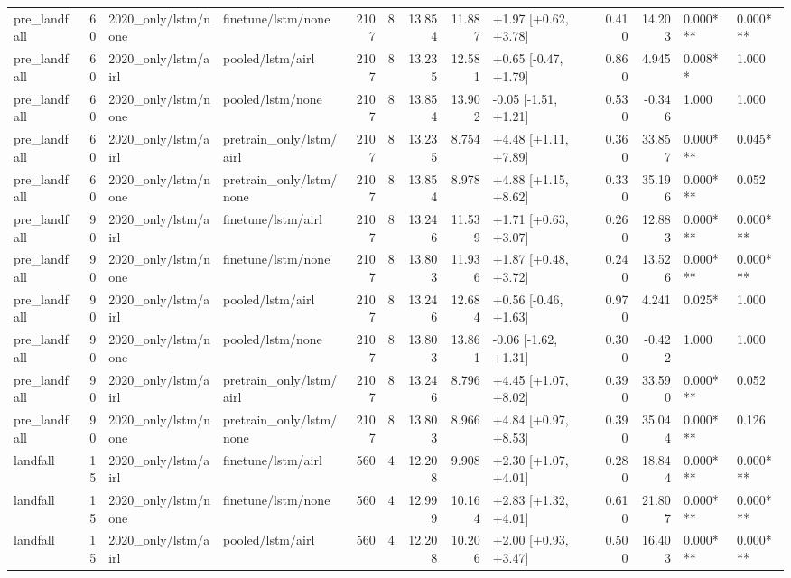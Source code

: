 \begin{tabular}{lrllrrrrlrrll}
pre_landfall & 60 & 2020_only/lstm/none & finetune/lstm/none & 2107 & 8 & 13.854 & 11.887 & +1.97 [+0.62, +3.78] & 0.410 & 14.203 & 0.000*** & 0.000*** \\
pre_landfall & 60 & 2020_only/lstm/airl & pooled/lstm/airl & 2107 & 8 & 13.235 & 12.581 & +0.65 [-0.47, +1.79] & 0.860 & 4.945 & 0.008** & 1.000 \\
pre_landfall & 60 & 2020_only/lstm/none & pooled/lstm/none & 2107 & 8 & 13.854 & 13.902 & -0.05 [-1.51, +1.21] & 0.530 & -0.346 & 1.000 & 1.000 \\
pre_landfall & 60 & 2020_only/lstm/airl & pretrain_only/lstm/airl & 2107 & 8 & 13.235 & 8.754 & +4.48 [+1.11, +7.89] & 0.360 & 33.857 & 0.000*** & 0.045* \\
pre_landfall & 60 & 2020_only/lstm/none & pretrain_only/lstm/none & 2107 & 8 & 13.854 & 8.978 & +4.88 [+1.15, +8.62] & 0.330 & 35.196 & 0.000*** & 0.052 \\
pre_landfall & 90 & 2020_only/lstm/airl & finetune/lstm/airl & 2107 & 8 & 13.246 & 11.539 & +1.71 [+0.63, +3.07] & 0.260 & 12.883 & 0.000*** & 0.000*** \\
pre_landfall & 90 & 2020_only/lstm/none & finetune/lstm/none & 2107 & 8 & 13.803 & 11.936 & +1.87 [+0.48, +3.72] & 0.240 & 13.526 & 0.000*** & 0.000*** \\
pre_landfall & 90 & 2020_only/lstm/airl & pooled/lstm/airl & 2107 & 8 & 13.246 & 12.684 & +0.56 [-0.46, +1.63] & 0.970 & 4.241 & 0.025* & 1.000 \\
pre_landfall & 90 & 2020_only/lstm/none & pooled/lstm/none & 2107 & 8 & 13.803 & 13.861 & -0.06 [-1.62, +1.31] & 0.300 & -0.422 & 1.000 & 1.000 \\
pre_landfall & 90 & 2020_only/lstm/airl & pretrain_only/lstm/airl & 2107 & 8 & 13.246 & 8.796 & +4.45 [+1.07, +8.02] & 0.390 & 33.590 & 0.000*** & 0.052 \\
pre_landfall & 90 & 2020_only/lstm/none & pretrain_only/lstm/none & 2107 & 8 & 13.803 & 8.966 & +4.84 [+0.97, +8.53] & 0.390 & 35.044 & 0.000*** & 0.126 \\
landfall & 15 & 2020_only/lstm/airl & finetune/lstm/airl & 560 & 4 & 12.208 & 9.908 & +2.30 [+1.07, +4.01] & 0.280 & 18.844 & 0.000*** & 0.000*** \\
landfall & 15 & 2020_only/lstm/none & finetune/lstm/none & 560 & 4 & 12.999 & 10.164 & +2.83 [+1.32, +4.01] & 0.610 & 21.807 & 0.000*** & 0.000*** \\
landfall & 15 & 2020_only/lstm/airl & pooled/lstm/airl & 560 & 4 & 12.208 & 10.206 & +2.00 [+0.93, +3.47] & 0.500 & 16.403 & 0.000*** & 0.000*** \\

\end{tabular}
